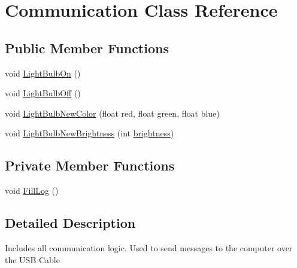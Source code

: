\hypertarget{class_communication}{\section{Communication Class Reference}
\label{class_communication}
}
\subsection*{Public Member Functions}
\begin{DoxyCompactItemize}
\item 
void \hyperlink{class_communication_ab08c4a1e2897b1be50347489c6b1ffe9}{Light\+Bulb\+On} ()
\item 
void \hyperlink{class_communication_a65706b5f91f1187f0a4f23b646319820}{Light\+Bulb\+Off} ()
\item 
void \hyperlink{class_communication_a47ff8ed3752d45472037ef0895971f22}{Light\+Bulb\+New\+Color} (float red, float green, float blue)
\item 
void \hyperlink{class_communication_aad2e5d0b646a4c8d125693b1f023ac50}{Light\+Bulb\+New\+Brightness} (int \hyperlink{main_8cpp_aa7ab72a18faba1d13601a9209ff2dcf8}{brightness})
\end{DoxyCompactItemize}
\subsection*{Private Member Functions}
\begin{DoxyCompactItemize}
\item 
void \hyperlink{class_communication_a8413d4900e71ff141deccfe86cd05736}{Fill\+Log} ()
\end{DoxyCompactItemize}


\subsection{Detailed Description}
Includes all communication logic. Used to send messages to the computer over the U\+S\+B Cable 

